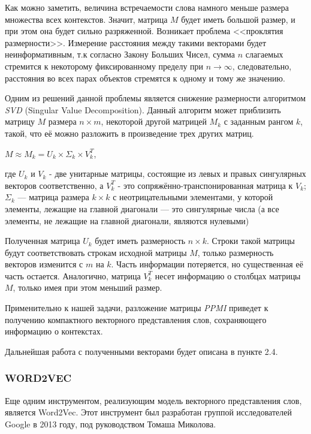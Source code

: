 Как можно заметить, величина встречаемости слова намного меньше размера множества
всех контекстов. Значит, матрица $M$ будет иметь большой размер, и при этом она будет
сильно разряженной. Возникает проблема <<проклятия размерности>>. Измерение
расстояния между такими векторами будет неинформативным, т.к согласно Закону
Больших Чисел, сумма $n$ слагаемых стремится к некоторому фиксированному пределу при $n \to \infty$, следовательно, расстояния во всех парах объектов стремятся к одному и тому же значению.

Одним из решений данной проблемы является снижение размерности алгоритмом \textit{SVD}
(Singular Value Decomposition). Данный алгоритм может приблизить матрицу $M$ размера $n \times m$, некоторой другой матрицей $M_k$ с заданным рангом $k$, такой, что её можно разложить в
произведение трех других матриц.

$M \approx M_k = U_k \times \Sigma_k \times V^T_k$,

где $U_k$ и $V_k$ - две унитарные матрицы, состоящие из левых и правых сингулярных
векторов соответственно, а $V^T_k$ - это сопряжённо-транспонированная матрица к $V_k$; $\Sigma_k$ — матрица размера $k \times k$ с неотрицательными элементами, у которой элементы,
лежащие на главной диагонали — это сингулярные числа (а все элементы, не лежащие на
главной диагонали, являются нулевыми)

Полученная матрица $U_k$ будет иметь размерность $n \times k$. Строки такой матрицы будут
соответствовать строкам исходной матрицы $M$, только размерность векторов изменится с
$m$ на $k$. Часть информации потеряется, но существенная её часть остается. Аналогично,
матрица $V^T_k$ несет информацию о столбцах матрицы $M$, только имея при этом меньший
размер.

Применительно к нашей задачи, разложение матрицы \textit{PPMI} приведет к получению
компактного векторного представления слов, сохраняющего информацию о контекстах.

Дальнейшая работа с полученными векторами будет описана в пункте 2.4.


\subsubsection{WORD2VEC}

Еще одним инструментом, реализующим модель векторного представления слов, является
Word2Vec. Этот инструмент был разработан группой исследователей Google в 2013 году,
под руководством Томаша Миколова.

